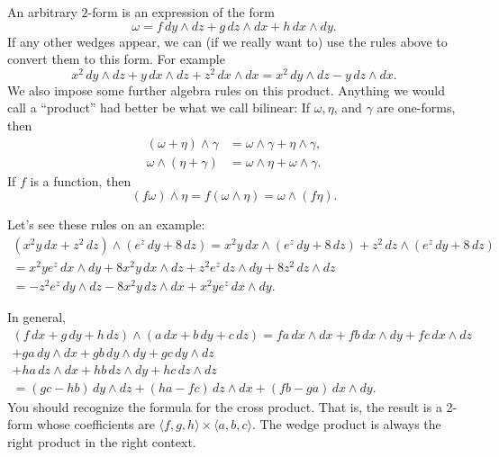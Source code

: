 \documentclass[12pt]{article}
\begin{document}
An arbitrary $2$-form is an expression of the form
\[
\omega = 
f\, dy \wedge dz + 
g\, dz \wedge dx +
h\, dx \wedge dy .
\]
If any other wedges appear, we can (if we really want to)
use the rules above to convert them to this
form.  For example
\[
x^2 \, dy \wedge dz + 
y \, dx \wedge dz +
z^2\, dx \wedge dx 
=
x^2 \, dy \wedge dz - y \, dz \wedge dx .
\]
We also impose some further algebra rules on this product.  Anything we would
call a ``product'' had better be
what we call bilinear:  If $\omega, \eta$, and $\gamma$ are one-forms, then
\begin{align*}
(\omega + \eta) \wedge \gamma
& =
\omega \wedge \gamma
+
\eta \wedge \gamma ,
\\
\omega \wedge (\eta + \gamma)
& =
\omega \wedge \eta
+
\omega \wedge \gamma .
\end{align*}
If $f$ is a function, then
\begin{equation*}
(f \omega) \wedge \eta =
f (\omega \wedge \eta) =
\omega \wedge ( f \eta) .
\end{equation*}

Let's see these rules on an example:
\begin{multline*}
( x^2 y \, dx + z^2 \, dz) \wedge (e^z \, dy + 8 \, dz)
=
x^2 y \, dx \wedge (e^z \, dy + 8 \, dz)
+
z^2 \, dz \wedge (e^z \, dy + 8 \, dz)
\\
=
x^2 y e^z \, dx \wedge dy
+
8 x^2 y \, dx \wedge dz
+
z^2 e^z \, dz \wedge dy
+
8 z^2 \, dz \wedge dz
\\
=
- z^2 e^z \, dy \wedge dz
-
8 x^2 y \, dz \wedge dx
+
x^2 y e^z \, dx \wedge dy .
\end{multline*}

In general,
\begin{multline*}
(f\, dx + g\, dy + h \, dz) \wedge
(a\, dx + b\, dy + c \, dz)
=
fa\, dx \wedge dx +
fb\, dx \wedge dy +
fc\, dx \wedge dz
\\
+
ga\, dy \wedge dx +
gb\, dy \wedge dy +
gc\, dy \wedge dz 
\\
+
ha\, dz \wedge dx +
hb\, dz \wedge dy +
hc\, dz \wedge dz
\\
=
(gc-hb)\, dy \wedge dz +
(ha-fc)\, dz \wedge dx +
(fb-ga) \, dx \wedge dy .
\end{multline*}
You should recognize the formula for the cross product.  That is,
the result is a 2-form whose coefficients are
$\langle f,g,h \rangle \times
\langle a,b,c \rangle$.
The wedge product
is always the right product in the right context.
\end{document}
